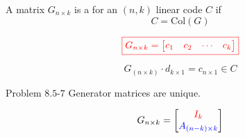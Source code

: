 \begin{frame}
  \begin{definition}
	A matrix $G_{n \times k}$ is a  for an $(n,k)$ linear code $C$ if 
	\[
	  C = \text{Col}(G)
	\]
  \end{definition}

  \[
	\textcolor{red}{\boxed{
	  G_{n \times k} = 
		\begin{bmatrix}
	      c_1 & c_2 & \cdots & c_k
		\end{bmatrix}
	  }}
  \]

  \pause
  \vspace{0.40cm}
  \[
	G_{(n \times k)} \cdot d_{k \times 1} = c_{n \times 1} \in C
  \]
\end{frame}

\begin{frame}
  \begin{exampleblock}{Problem $8.5$-$7$}
	Generator matrices are  unique.
  \end{exampleblock}

  \pause
  \vspace{0.30cm}

  \pause
  \begin{definition}
	\[
	  G_{n \times k} = \begin{bmatrix}
		\textcolor{red}{I_k} \\ \textcolor{blue}{A_{(n-k) \times k}}
	  \end{bmatrix}
	\]
  \end{definition}
\end{frame}

